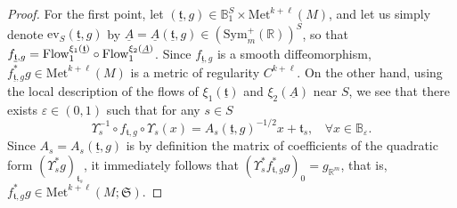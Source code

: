 \documentclass{article}
\numberwithin{equation}{section}        %
\theoremstyle{bfnote}
\theoremstyle{definition}
\theoremstyle{bfremark}
\newcommand{\R}{\mathbb{R}}                 %
\newcommand{\Ball}{\mathbb{B}}              %
\newcommand{\Met}{\mathrm{Met}}             %
\begin{document}
\begin{proof}
    For the first point, let $(\underline{\mathfrak{t}},g) \in \Ball_1^S \times \Met^{k+\ell}(M)$, and let us simply denote $\mathrm{ev}_S(\underline{\mathfrak{t}},g)$ by $\underline{A} = \underline{A}(\underline{\mathfrak{t}},g) \in (\mathrm{Sym}^+_m(\R))^S$, so that $f_{\underline{\mathfrak{t}},g} = \textup{Flow}_1^{\xi_1(\underline{\mathfrak{t}})} \circ \textup{Flow}_1^{\xi_2(\underline{A})}$. Since $f_{\underline{\mathfrak{t}},g}$ is a smooth diffeomorphism, $f_{\underline{\mathfrak{t}},g}^* g \in \Met^{k+\ell}(M)$ is a metric of regularity $C^{k+\ell}$. On the other hand, using the local description of the flows of $\xi_1(\underline{\mathfrak{t}})$ and $\xi_2(\underline{A})$ near $S$, we see that there exists $\varepsilon \in (0,1)$ such that for any $s \in S$
    \begin{equation}        \label{eq: local flow}
        \Upsilon_{s}^{-1} \circ f_{\mathfrak{t},g} \circ \Upsilon_s(x) = A_s(\underline{\mathfrak{t}},g)^{-1/2} x + \mathfrak{t}_s , ~~~~ \forall x \in \Ball_\varepsilon.
    \end{equation}
    Since $A_s = A_s(\underline{\mathfrak{t}},g)$ is by definition the matrix of coefficients of the quadratic form $(\Upsilon_s^*g)_{\mathfrak{t}_s}$, it immediately follows that $(\Upsilon_s^* f_{\mathfrak{t},g}^*g)_{0} = g_{\R^m}$, that is, $f_{\mathfrak{t},g}^*g \in \Met^{k+\ell}(M;\mathfrak{S})$.


\end{proof}
\end{document}
